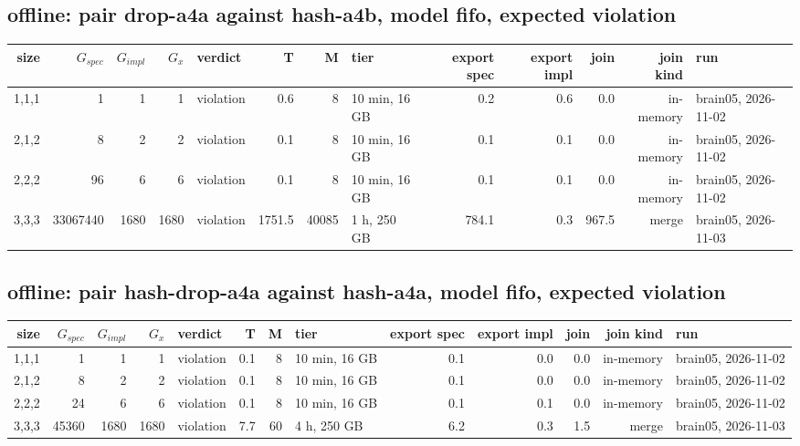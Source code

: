 \documentclass[10pt]{article}
\begin{document}
\subsection*{offline: pair \textsf{drop-a4a} against \textsf{hash-a4b}, model fifo, expected violation}
\begin{longtable}{@{}rrrrlrrlrrrrl@{}}
\toprule
size & $G_{\mathit{spec}}$ & $G_{\mathit{impl}}$ & $G_x$ & verdict & T & M & tier & export spec & export impl & join & join kind & run \\
\midrule
\endhead
\color{red} 1,1,1 & 1 & 1 & 1 & violation & 0.6 & 8 & 10 min, 16 GB & 0.2 & 0.6 & 0.0 & in-memory & brain05, 2026-11-02 \\
\color{red} 2,1,2 & 8 & 2 & 2 & violation & 0.1 & 8 & 10 min, 16 GB & 0.1 & 0.1 & 0.0 & in-memory & brain05, 2026-11-02 \\
\color{red} 2,2,2 & 96 & 6 & 6 & violation & 0.1 & 8 & 10 min, 16 GB & 0.1 & 0.1 & 0.0 & in-memory & brain05, 2026-11-02 \\
\color{blue} 3,3,3 & 33067440 & 1680 & 1680 & violation & 1751.5 & 40085 & 1 h, 250 GB & 784.1 & 0.3 & 967.5 & merge & brain05, 2026-11-03 \\
\bottomrule
\end{longtable}
\subsection*{offline: pair \textsf{hash-drop-a4a} against \textsf{hash-a4a}, model fifo, expected violation}
\begin{longtable}{@{}rrrrlrrlrrrrl@{}}
\toprule
size & $G_{\mathit{spec}}$ & $G_{\mathit{impl}}$ & $G_x$ & verdict & T & M & tier & export spec & export impl & join & join kind & run \\
\midrule
\endhead
\color{red} 1,1,1 & 1 & 1 & 1 & violation & 0.1 & 8 & 10 min, 16 GB & 0.1 & 0.0 & 0.0 & in-memory & brain05, 2026-11-02 \\
\color{red} 2,1,2 & 8 & 2 & 2 & violation & 0.1 & 8 & 10 min, 16 GB & 0.1 & 0.0 & 0.0 & in-memory & brain05, 2026-11-02 \\
\color{red} 2,2,2 & 24 & 6 & 6 & violation & 0.1 & 8 & 10 min, 16 GB & 0.1 & 0.1 & 0.0 & in-memory & brain05, 2026-11-02 \\
\color{blue} 3,3,3 & 45360 & 1680 & 1680 & violation & 7.7 & 60 & 4 h, 250 GB & 6.2 & 0.3 & 1.5 & merge & brain05, 2026-11-03 \\
\bottomrule
\end{longtable}
\end{document}
